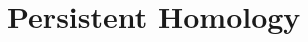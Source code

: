 \documentclass[11pt,a4paper]{report}
\begin{document}

                
             \chapter{Persistent Homology}
               
\end{document}

